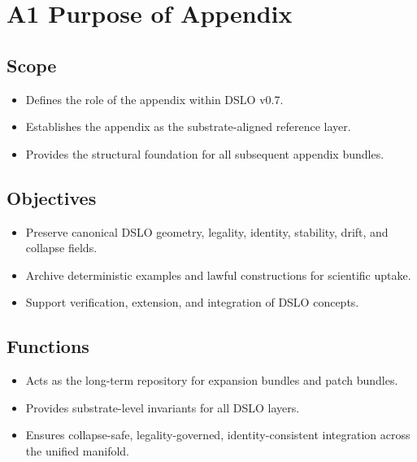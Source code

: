 \section{A1 Purpose of Appendix}

\subsection{Scope}
\begin{itemize}
    \item Defines the role of the appendix within DSLO v0.7.
    \item Establishes the appendix as the substrate-aligned reference layer.
    \item Provides the structural foundation for all subsequent appendix bundles.
\end{itemize}

\subsection{Objectives}
\begin{itemize}
    \item Preserve canonical DSLO geometry, legality, identity, stability, drift, and collapse fields.
    \item Archive deterministic examples and lawful constructions for scientific uptake.
    \item Support verification, extension, and integration of DSLO concepts.
\end{itemize}

\subsection{Functions}
\begin{itemize}
    \item Acts as the long-term repository for expansion bundles and patch bundles.
    \item Provides substrate-level invariants for all DSLO layers.
    \item Ensures collapse-safe, legality-governed, identity-consistent integration across the unified manifold.
\end{itemize}
